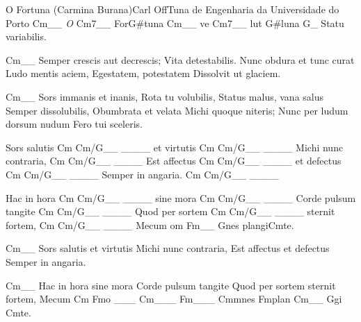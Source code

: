 \begin{musica}{O Fortuna (Carmina Burana)}{Carl Off}{Tuna de Engenharia da Universidade do Porto}
\ac{Cm}{}\textit{__ O} \ac{Cm7}{}\textit{__} For\ac{G#}{tu}na \ac{Cm}{}__ ve \ac{Cm7}{}__ lut \ac{G#}{lu}na
\ac{G}{}_ Statu variabilis.

\ac{Cm}{}__ Semper crescis aut decrescis;
Vita detestabilis.
Nunc obdura et tunc curat
Ludo mentis aciem,
Egestatem, potestatem
Dissolvit ut glaciem.

\ac{Cm}{}__ Sors immanis et inanis,
Rota tu volubilis,
Status malus, vana salus
Semper dissolubilis,
Obumbrata et velata
Michi quoque niteris;
Nunc per ludum dorsum nudum
Fero tui sceleris.

Sors salutis \ac{Cm Cm/G}{}__ ____ et virtutis \ac{Cm Cm/G}{}__ ____
Michi nunc contraria, \ac{Cm Cm/G}{}__ ____
Est affectus \ac{Cm Cm/G}{}__ ____ et defectus \ac{Cm Cm/G}{}__ ____
Semper in angaria. \ac{Cm Cm/G}{}__ ____

Hac in hora \ac{Cm Cm/G}{}__ ____ sine mora \ac{Cm Cm/G}{}__ ____
Corde pulsum tangite \ac{Cm Cm/G}{}__ ____
Quod per sortem \ac{Cm Cm/G}{}__ ____ sternit fortem, \ac{Cm Cm/G}{}__ ____
Mecum om \ac{Fm}{}__ \ac{G}{nes} plangi\ac{Cm}{te}.


\ac{Cm}{}__ Sors salutis et virtutis
Michi nunc contraria,
Est affectus et defectus
Semper in angaria.

\ac{Cm}{}__ Hac in hora sine mora
Corde pulsum tangite
Quod per sortem sternit fortem,
Mecum \ac{Cm Fm}{o} ___ \ac{Cm}{}___ \ac{Fm}{}___ \ac{Cm}{mnes} \ac{Fm}{plan} \ac{Cm}{}__ \ac{G}{gi} \ac{Cm}{te}.

\end{musica}
